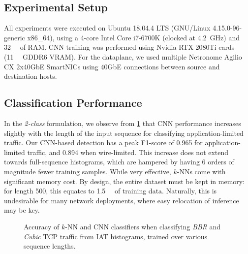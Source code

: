 \subsection{Experimental Setup}
All experiments were executed on Ubuntu 18.04.4 LTS (GNU/Linux 4.15.0-96-generic x86\_64), using a 4-core Intel Core i7-6700K (clocked at \SI{4.2}{\giga\hertz}) and \SI{32}{\giga\byte} of RAM.
CNN training was performed using Nvidia RTX 2080Ti cards (\SI{11}{\giga\byte} GDDR6 VRAM).
For the dataplane, we used multiple Netronome Agilio CX 2x40GbE SmartNICs using 40GbE connections between source and destination hosts.


\subsection{Classification Performance}
In the \emph{2-class} formulation, we observe from \cref{fig:2c-results} that CNN performance increases slightly with the length of the input sequence for classifying application-limited traffic.
Our CNN-based detection has a peak F1-score of \num{0.965} for application-limited traffic, and \num{0.894} when wire-limited.
This increase does not extend towards full-sequence histograms, which are hampered by having 6 orders of magnitude fewer training samples.
While very effective, $k$-NNs come with significant memory cost.
By design, the entire dataset must be kept in memory: for length \num{500}, this equates to \SI{1.5}{\gibi\byte} of training data.
Naturally, this is undesirable for many network deployments, where easy relocation of inference may be key.

\begin{figure}
    \centering
    \vspace{-0.25cm}
    \caption{Accuracy of $k$-NN and CNN classifiers when classifying \emph{BBR} and \emph{Cubic} TCP traffic from IAT histograms, trained  over various sequence lengths.}
    \label{fig:2c-results}
    \vspace{-0.5cm}
\end{figure}

